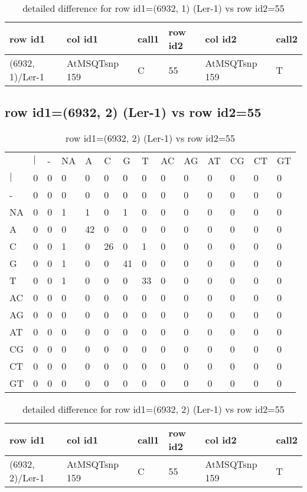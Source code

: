 \begin{center}
\begin{longtable}{|l|l|l|l|l|l|}
\caption{detailed difference for row id1=(6932, 1) (Ler-1) vs row id2=55} \label{table_dm131}\\
\hline
row id1&col id1&call1&row id2&col id2&call2\\
\hline
(6932, 1)/Ler-1&AtMSQTsnp 159&C&55&AtMSQTsnp 159&T\\
\hline
\end{longtable}
\end{center}

\subsection{row id1=(6932, 2) (Ler-1) vs row id2=55}
\begin{center}
\begin{longtable}{|l|l|l|l|l|l|l|l|l|l|l|l|l|l|}
\caption{row id1=(6932, 2) (Ler-1) vs row id2=55} \label{table_dm132}\\
\hline
\\
\hline
&$|$&-&NA&A&C&G&T&AC&AG&AT&CG&CT&GT\\
$|$&0&0&0&0&0&0&0&0&0&0&0&0&0\\
-&0&0&0&0&0&0&0&0&0&0&0&0&0\\
NA&0&0&1&1&0&1&0&0&0&0&0&0&0\\
A&0&0&0&42&0&0&0&0&0&0&0&0&0\\
C&0&0&1&0&26&0&1&0&0&0&0&0&0\\
G&0&0&1&0&0&41&0&0&0&0&0&0&0\\
T&0&0&1&0&0&0&33&0&0&0&0&0&0\\
AC&0&0&0&0&0&0&0&0&0&0&0&0&0\\
AG&0&0&0&0&0&0&0&0&0&0&0&0&0\\
AT&0&0&0&0&0&0&0&0&0&0&0&0&0\\
CG&0&0&0&0&0&0&0&0&0&0&0&0&0\\
CT&0&0&0&0&0&0&0&0&0&0&0&0&0\\
GT&0&0&0&0&0&0&0&0&0&0&0&0&0\\
\hline
\end{longtable}
\end{center}

\begin{center}
\begin{longtable}{|l|l|l|l|l|l|}
\caption{detailed difference for row id1=(6932, 2) (Ler-1) vs row id2=55} \label{table_dm133}\\
\hline
row id1&col id1&call1&row id2&col id2&call2\\
\hline
(6932, 2)/Ler-1&AtMSQTsnp 159&C&55&AtMSQTsnp 159&T\\
\hline
\end{longtable}
\end{center}

